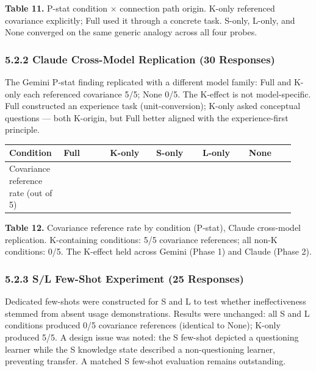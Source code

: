 \documentclass[
]{article}
\newcounter{none} %
\begin{document}
\textbf{Table 11.} P-stat condition × connection path origin. K-only referenced covariance explicitly; Full used it through a concrete task. S-only, L-only, and None converged on the same generic analogy across all four probes.

\subsubsection{5.2.2 Claude Cross-Model Replication (30 Responses)}\label{522-claude-cross-model-replication-30-responses}

The Gemini P-stat finding replicated with a different model family: Full and K-only each referenced covariance 5/5; None 0/5. The K-effect is not model-specific. Full constructed an experience task (unit-conversion); K-only asked conceptual questions --- both K-origin, but Full better aligned with the experience-first principle.

{\def\LTcaptype{none} %
\begin{longtable}[]{@{}>{\raggedright\arraybackslash}p{0.155\linewidth}>{\raggedright\arraybackslash}p{0.155\linewidth}>{\raggedright\arraybackslash}p{0.155\linewidth}>{\raggedright\arraybackslash}p{0.155\linewidth}>{\raggedright\arraybackslash}p{0.155\linewidth}>{\raggedright\arraybackslash}p{0.155\linewidth}@{}}
\toprule\noalign{}
Condition & Full & K-only & S-only & L-only & None \\
\midrule\noalign{}
\endhead
\bottomrule\noalign{}
\endlastfoot
Covariance reference rate (out of 5) & 5 & 5 & 0 & 0 & 0 \\
\end{longtable}
}

\textbf{Table 12.} Covariance reference rate by condition (P-stat), Claude cross-model replication. K-containing conditions: 5/5 covariance references; all non-K conditions: 0/5. The K-effect held across Gemini (Phase 1) and Claude (Phase 2).

\subsubsection{5.2.3 S/L Few-Shot Experiment (25 Responses)}\label{523-sl-few-shot-experiment-25-responses}

Dedicated few-shots were constructed for S and L to test whether ineffectiveness stemmed from absent usage demonstrations. Results were unchanged: all S and L conditions produced 0/5 covariance references (identical to None); K-only produced 5/5. A design issue was noted: the S few-shot depicted a questioning learner while the S knowledge state described a non-questioning learner, preventing transfer. A matched S few-shot evaluation remains outstanding.
\end{document}
